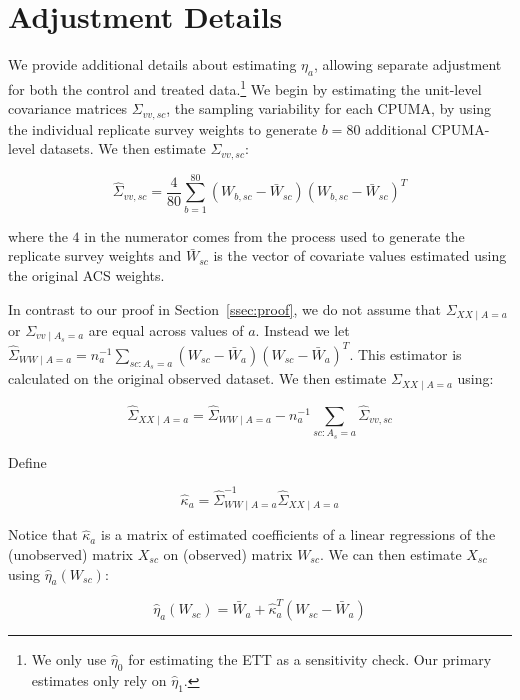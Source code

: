 \section{Adjustment Details}

We provide additional details about estimating $\eta_a$, allowing separate adjustment for both the control and treated data.\footnote{We only use $\hat{\eta}_0$ for estimating the ETT as a sensitivity check. Our primary estimates only rely on $\hat{\eta}_1$.} We begin by estimating the unit-level covariance matrices $\Sigma_{vv, sc}$, the sampling variability for each CPUMA, by using the individual replicate survey weights to generate $b = 80$ additional CPUMA-level datasets. We then estimate $\Sigma_{vv, sc}$:

\begin{equation}
\hat{\Sigma}_{vv, sc} = \frac{4}{80}\sum_{b=1}^{80}(W_{b, sc} - \bar{W}_{sc})(W_{b, sc} - \bar{W}_{sc})^T
\end{equation}

where the $4$ in the numerator comes from the process used to generate the replicate survey weights and $\bar{W}_{sc}$ is the vector of covariate values estimated using the original ACS weights.

In contrast to our proof in Section~\ref{ssec:proof}, we do not assume that $\Sigma_{XX \mid A = a}$ or $\Sigma_{vv \mid A_s = a}$ are equal across values of $a$. Instead we let $\hat{\Sigma}_{WW \mid A = a} = n_a^{-1}\sum_{sc: A_s = a} (W_{sc} - \bar{W}_a)(W_{sc} - \bar{W}_a)^T$. This estimator is calculated on the original observed dataset. We then estimate $\Sigma_{XX \mid A = a}$ using:

\begin{equation}
\hat{\Sigma}_{XX \mid A = a} = \hat{\Sigma}_{WW \mid A = a} - n_a^{-1}\sum_{sc: A_s = a} \hat{\Sigma}_{vv, sc}
\end{equation}

Define

\begin{equation}
\hat{\kappa}_a = \hat{\Sigma}_{WW \mid A = a}^{-1}\hat{\Sigma}_{XX \mid A = a}
\end{equation}

Notice that $\hat{\kappa}_a$ is a matrix of estimated coefficients of a linear regressions of the (unobserved) matrix $X_{sc}$ on (observed) matrix $W_{sc}$. We can then estimate $X_{sc}$ using $\hat{\eta}_a(W_{sc})$: 

\begin{equation}
\hat{\eta}_a(W_{sc}) = \bar{W}_a + \hat{\kappa}_a^T(W_{sc} - \bar{W}_a)
\end{equation}

